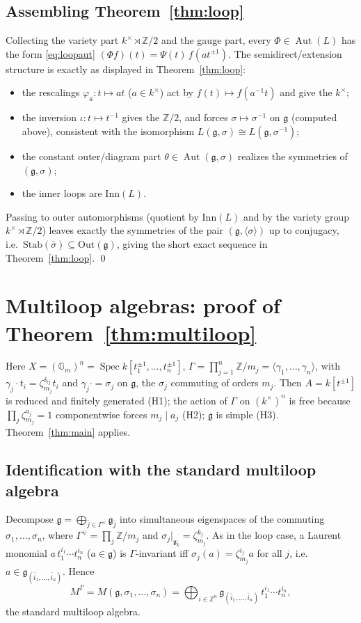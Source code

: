 \documentclass{amsart}
\theoremstyle{definition}
\DeclareMathOperator{\Aut}{Aut}
\DeclareMathOperator{\Spec}{Spec}
\newcommand{\Gm}{\mathbb{G}_m}
\newcommand{\g}{\mathfrak{g}}
\newcommand{\Z}{\mathbb{Z}}
\newcommand{\M}{M}
\begin{document}
\subsection{Assembling Theorem~\ref{thm:loop}}
Collecting the variety part $k^\times\rtimes\Z/2$ and the gauge part, every
$\Phi\in\Aut(L)$ has the form \eqref{eq:loopaut}
$(\Phi f)(t)=\Psi(t)\,f(at^{\pm1})$.  The semidirect/extension structure is
exactly as displayed in Theorem~\ref{thm:loop}:
\begin{itemize}
\item the rescalings $\varphi_a:t\mapsto at$ ($a\in k^\times$) act by
$f(t)\mapsto f(a^{-1}t)$ and give the $k^\times$;
\item the inversion $\iota:t\mapsto t^{-1}$ gives the $\Z/2$, and forces
$\sigma\mapsto\sigma^{-1}$ on $\g$ (computed above), consistent with the
isomorphism $L(\g,\sigma)\cong L(\g,\sigma^{-1})$;
\item the constant outer/diagram part $\theta\in\Aut(\g,\sigma)$ realizes
the symmetries of $(\g,\sigma)$;
\item the inner loops are $\mathrm{Inn}(L)$.
\end{itemize}
Passing to outer automorphisms (quotient by $\mathrm{Inn}(L)$ and by the
variety group $k^\times\rtimes\Z/2$) leaves exactly the symmetries of the
pair $(\g,\langle\sigma\rangle)$ up to conjugacy, i.e.\
$\mathrm{Stab}(\bar\sigma)\subseteq\mathrm{Out}(\g)$, giving the short exact
sequence in Theorem~\ref{thm:loop}.  \qed

\section{Multiloop algebras: proof of Theorem~\ref{thm:multiloop}}
\label{sec:multiloop}

Here $X=(\Gm)^n=\Spec k[t_1^{\pm1},\dots,t_n^{\pm1}]$,
$\Gamma=\prod_{j=1}^n\Z/m_j=\langle\gamma_1,\dots,\gamma_n\rangle$, with
$\gamma_j\cdot t_i=\zeta_{m_j}^{\delta_{ij}}t_i$ and $\gamma_j\cdot=
\sigma_j$ on $\g$, the $\sigma_j$ commuting of orders $m_j$.  Then
$A=k[t^{\pm1}]$ is reduced and finitely generated (H1); the action of
$\Gamma$ on $(k^\times)^n$ is free because $\prod_j\zeta_{m_j}^{a_j}=1$
componentwise forces $m_j\mid a_j$ (H2); $\g$ is simple (H3).
Theorem~\ref{thm:main} applies.

\subsection{Identification with the standard multiloop algebra}
Decompose $\g=\bigoplus_{\bar j\in\Gamma^\vee}\g_{\bar j}$ into
simultaneous eigenspaces of the commuting $\sigma_1,\dots,\sigma_n$, where
$\Gamma^\vee=\prod_j\Z/m_j$ and $\sigma_j|_{\g_{\bar k}}=
\zeta_{m_j}^{k_j}$.  As in the loop case, a Laurent monomial
$a\,t_1^{i_1}\cdots t_n^{i_n}$ ($a\in\g$) is $\Gamma$-invariant iff
$\sigma_j(a)=\zeta_{m_j}^{i_j}a$ for all $j$, i.e.\
$a\in\g_{(\bar i_1,\dots,\bar i_n)}$.  Hence
\[
\M^\Gamma=M(\g,\sigma_1,\dots,\sigma_n)
=\bigoplus_{i\in\Z^n}\g_{(\bar i_1,\dots,\bar i_n)}\,t_1^{i_1}\cdots
t_n^{i_n},
\]
the standard multiloop algebra.
\end{document}
